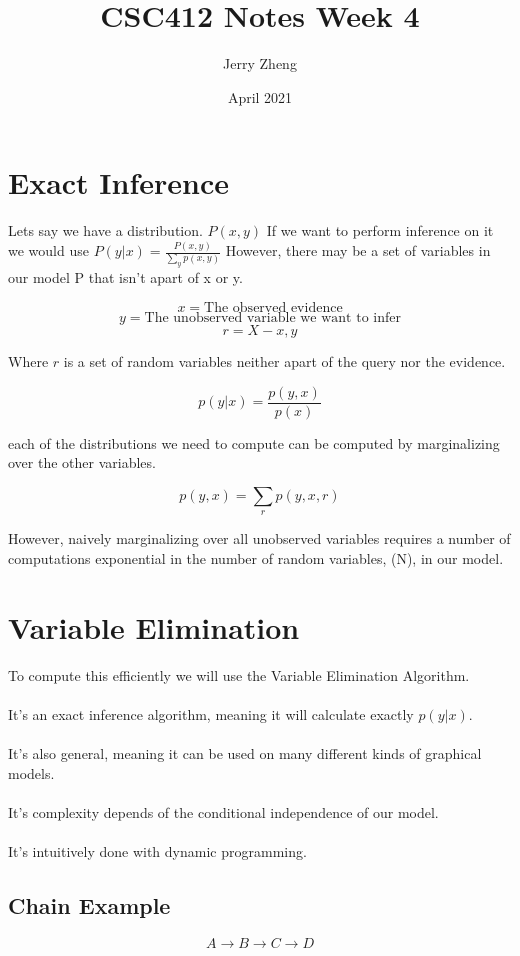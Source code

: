\documentclass{article}
\title{CSC412 Notes Week 4}
\author{Jerry Zheng}
\date{April 2021}
\begin{document}
\maketitle
\section{Exact Inference}
Lets say we have a distribution. $P(x, y)$
If we want to perform inference on it we would use $P(y|x) = \frac{P(x,y)}{\sum_{y}p(x,y)}$
However, there may be a set of variables in our model P that isn't apart of x or y.

$$x = \text{The observed evidence}$$
$$y = \text{The unobserved variable we want to infer} $$
$$r = X - {x, y} $$

Where $r$ is a set of random variables neither apart of the query nor the evidence.

$$p(y | x) = \frac{p(y, x)}{p(x)}$$

each of the distributions we need to compute can be computed by marginalizing over the other variables.

$$p(y, x) = \sum_{r}p(y, x, r)$$

However, naively marginalizing over all unobserved variables requires a number of computations exponential in the number of random variables, (N), in our model.

\section{Variable Elimination}
To compute this efficiently we will use the Variable Elimination Algorithm.\\
\\
It's an exact inference algorithm, meaning it will calculate exactly $p(y|x)$.\\
\\
It's also general, meaning it can be used on many different kinds of graphical models.\\
\\
It's complexity depends of the conditional independence of our model.\\
\\
It's intuitively done with dynamic programming.

\subsection{Chain Example}
$$ A \rightarrow B \rightarrow C \rightarrow D $$
\end{document}
